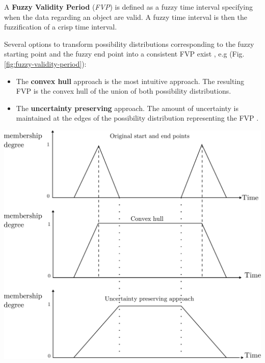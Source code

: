 \begin{definition}
A \textbf{Fuzzy Validity Period}\cite{Garrido2009} (\emph{FVP}) is defined as a fuzzy time interval specifying when the data regarding an object are valid. A fuzzy time interval is then the fuzzification of a crisp time interval.\\
\end{definition}


Several options to transform possibility distributions corresponding to the fuzzy starting point and the fuzzy end point into a consistent FVP exist \cite{Garrido2009}, e.g (Fig. \ref{fig:fuzzy-validity-period}):
\begin{itemize}
\item The \textbf{convex hull} approach is the most intuitive approach. The resulting FVP is the convex hull of the union of both possibility distributions.
\item The \textbf{uncertainty preserving} approach. The amount of uncertainty is maintained at the edges of the possibility distribution representing the FVP \cite{Garrido2009}.
\end{itemize}

\begin{samepage}
\vspace*{13pt}
\begin{center}
{
\includegraphics[scale=0.25]{./graphs/comparisoncv.pdf}

}
\end{center}
\vspace*{10pt}
\end{samepage}

